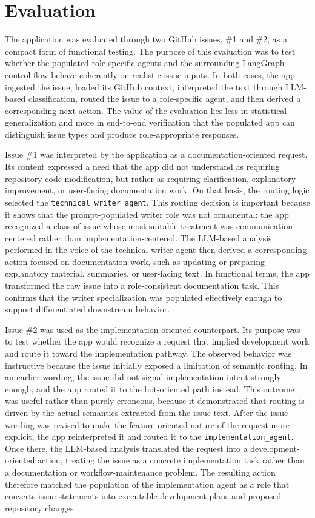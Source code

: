 \documentclass[11pt,a4paper]{article}
\begin{document}
\section{Evaluation}

The application was evaluated through two GitHub issues, \#1 and \#2, as a compact form of functional testing. The purpose of this evaluation was to test whether the populated role-specific agents and the surrounding LangGraph control flow behave coherently on realistic issue inputs. In both cases, the app ingested the issue, loaded its GitHub context, interpreted the text through LLM-based classification, routed the issue to a role-specific agent, and then derived a corresponding next action. The value of the evaluation lies less in statistical generalization and more in end-to-end verification that the populated app can distinguish issue types and produce role-appropriate responses.

Issue \#1 was interpreted by the application as a documentation-oriented request. Its content expressed a need that the app did not understand as requiring repository code modification, but rather as requiring clarification, explanatory improvement, or user-facing documentation work. On that basis, the routing logic selected the \texttt{technical\_writer\_agent}. This routing decision is important because it shows that the prompt-populated writer role was not ornamental: the app recognized a class of issue whose most suitable treatment was communication-centered rather than implementation-centered. The LLM-based analysis performed in the voice of the technical writer agent then derived a corresponding action focused on documentation work, such as updating or preparing explanatory material, summaries, or user-facing text. In functional terms, the app transformed the raw issue into a role-consistent documentation task. This confirms that the writer specialization was populated effectively enough to support differentiated downstream behavior.

Issue \#2 was used as the implementation-oriented counterpart. Its purpose was to test whether the app would recognize a request that implied development work and route it toward the implementation pathway. The observed behavior was instructive because the issue initially exposed a limitation of semantic routing. In an earlier wording, the issue did not signal implementation intent strongly enough, and the app routed it to the bot-oriented path instead. This outcome was useful rather than purely erroneous, because it demonstrated that routing is driven by the actual semantics extracted from the issue text. After the issue wording was revised to make the feature-oriented nature of the request more explicit, the app reinterpreted it and routed it to the \texttt{implementation\_agent}. Once there, the LLM-based analysis translated the request into a development-oriented action, treating the issue as a concrete implementation task rather than a documentation or workflow-maintenance problem. The resulting action therefore matched the population of the implementation agent as a role that converts issue statements into executable development plans and proposed repository changes.
\end{document}
